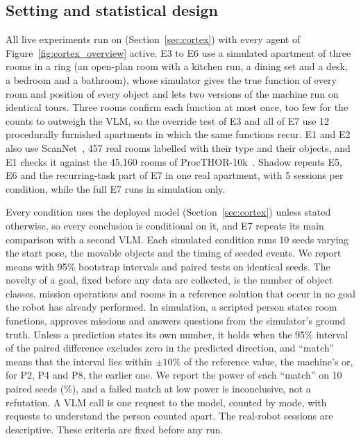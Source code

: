 \subsection{Setting and statistical design}
\label{sec:experiments:setting}

All live experiments run on \cortex{} (Section~\ref{sec:cortex}) with every agent of Figure~\ref{fig:cortex_overview}
active. E3 to E6 use a simulated apartment of three rooms in a ring (an open-plan room with a kitchen run, a dining
set and a desk, a bedroom and a bathroom), whose simulator gives the true function of every room and position of every
object and lets two versions of the machine run on identical tours. Three rooms confirm each function at most once,
too few for the counts to outweigh the VLM, so the override test of E3 and all of E7 use 12 procedurally furnished
apartments in which the same functions recur. E1 and E2 also use ScanNet~\cite{dai2017scannet}, 457 real rooms labelled with
their type and their objects, and E1 checks it against the 45{,}160 rooms of ProcTHOR-10k~\cite{deitke2022procthor}. Shadow repeats E5, E6 and the recurring-task part of E7 in one real apartment,
with 5 sessions per condition, while the full E7 runs in simulation only.

Every condition uses the deployed model (Section~\ref{sec:cortex}) unless stated otherwise, so every conclusion is
conditional on it, and E7 repeats its main comparison with a second VLM. Each simulated condition runs 10 seeds
varying the start pose, the movable objects and the timing of seeded events. We report means with 95\% bootstrap
intervals and paired tests on identical seeds. The novelty of a goal, fixed before any data are collected, is the
number of object classes, mission operations and rooms in a reference solution that occur in no goal the robot has
already performed. In simulation, a scripted person states room functions, approves missions and answers
questions from the simulator's ground truth. Unless a prediction states its own number, it holds when the 95\%
interval of the paired difference excludes zero in the predicted direction, and ``match'' means that the interval lies
within $\pm 10\%$ of the reference value, the machine's or, for P2, P4 and P8, the earlier one. We report the power of
each ``match'' on 10 paired seeds (\result{--}\%), and a failed match at low power is inconclusive, not a refutation.
A VLM call is one request to the model, counted by mode, with requests to understand the person counted apart. The
real-robot sessions are descriptive. These criteria are fixed before any run.


